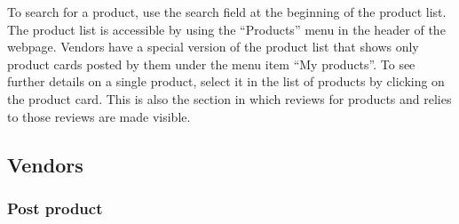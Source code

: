 \documentclass[conference,onecolumn,a4paper]{IEEEtran}
\begin{document}
To search for a product, use the search field at the beginning of the product list. The product list is accessible by using the “Products” menu in the header of the webpage. Vendors have a special version of the product list that shows only product cards posted by them under the menu item “My products”. To see further details on a single product, select it in the list of products by clicking on the product card. This is also the section in which reviews for products and relies to those reviews are made visible.


\subsection{Vendors}

\subsubsection{Post product}
\end{document}
